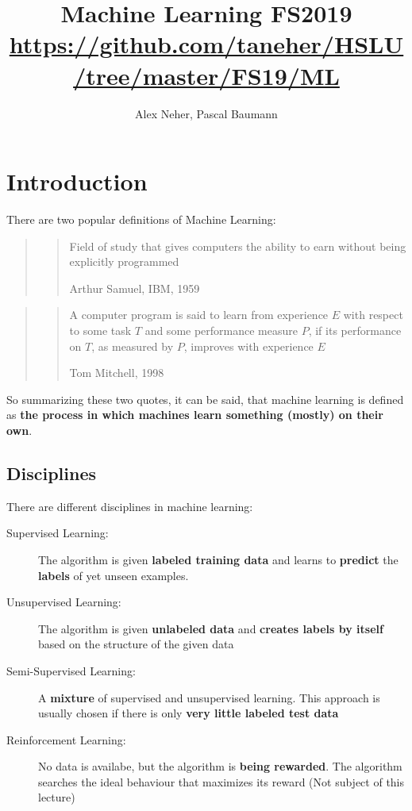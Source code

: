 \documentclass[a4paper, 11pt]{article}
\begin{document}
\title{Machine Learning FS2019\\[0.2em]\normalsize{\url{https://github.com/taneher/HSLU/tree/master/FS19/ML}}}
\author{Alex Neher, Pascal Baumann}
\maketitle

\tableofcontents

\newpage
\graphicspath{{./Pictures/}}

\restoregeometry

\section{Introduction}

There are two popular definitions of Machine Learning:

\begin{centering}
    \begin{quote}
        \blockquote[Arthur Samuel, IBM, 1959]{Field of study that gives computers the ability to earn without being explicitly programmed}
    \end{quote}

    \begin{quote}
        \blockquote[Tom Mitchell, 1998]{A computer program is said to learn from experience $E$ with respect to some task $T$ and some performance measure $P$, if its performance on $T$, as measured by $P$, improves with experience $E$}
    \end{quote}
\end{centering}

So summarizing these two quotes, it can be said, that machine learning is defined as \textbf{the process in which machines learn something (mostly) on their own}.

\subsection{Disciplines}

There are different disciplines in machine learning:

\begin{description}
    \item[Supervised Learning: ] The algorithm is given \textbf{labeled training data} and learns to \textbf{predict} the \textbf{labels} of yet unseen examples.
    \item[Unsupervised Learning: ] The algorithm is given \textbf{unlabeled data} and \textbf{creates labels by itself} based on the structure of the given data
    \item[Semi-Supervised Learning: ] A \textbf{mixture} of supervised and unsupervised learning. This approach is usually chosen if there is only \textbf{very little labeled test data}
    \item[Reinforcement Learning: ] No data is availabe, but the algorithm is \textbf{being rewarded}. The algorithm searches the ideal behaviour that maximizes its reward (Not subject of this lecture)
\end{description}
\end{document}
